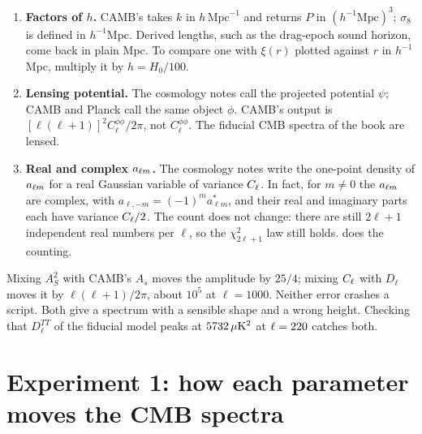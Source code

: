 \begin{enumerate}[leftmargin=1.6em,itemsep=3pt]
\item \textbf{Factors of $h$.} CAMB's  takes $k$ in $h\,\mathrm{Mpc}^{-1}$ and returns $P$ in $(h^{-1}\mathrm{Mpc})^3$; $\sigma_8$ is defined in $h^{-1}$Mpc. Derived lengths, such as the drag-epoch sound horizon, come back in plain Mpc. To compare one with $\xi(r)$ plotted against $r$ in $h^{-1}$Mpc, multiply it by $h=H_0/100$.
\item \textbf{Lensing potential.} The cosmology notes call the projected potential $\psi$; CAMB and Planck call the same object $\phi$. CAMB's  output is $[\ell(\ell+1)]^2C_\ell^{\phi\phi}/2\pi$, not $C_\ell^{\phi\phi}$. The fiducial CMB spectra of the book are lensed.
\item \textbf{Real and complex $a_{\ell m}$.} The cosmology notes write the one-point density of $a_{\ell m}$ for a real Gaussian variable of variance $C_\ell$. In fact, for $m\neq0$ the $a_{\ell m}$ are complex, with $a_{\ell,-m}=(-1)^ma^*_{\ell m}$, and their real and imaginary parts each have variance $C_\ell/2$. The count does not change: there are still $2\ell+1$ independent real numbers per $\ell$, so the $\chi^2_{2\ell+1}$ law still holds.  does the counting.
\end{enumerate}

\begin{pitfall}
Mixing $A_S^2$ with CAMB's $A_s$ moves the amplitude by $25/4$; mixing $C_\ell$ with $D_\ell$ moves it by $\ell(\ell+1)/2\pi$, about $10^5$ at $\ell=1000$. Neither error crashes a script. Both give a spectrum with a sensible shape and a wrong height. Checking that $D_\ell^{TT}$ of the fiducial model peaks at $5732\,\mu\mathrm K^2$ at $\ell=220$ catches both.
\end{pitfall}

\section{Experiment 1: how each parameter moves the CMB spectra}
\label{T1a:sec:cl-response}

